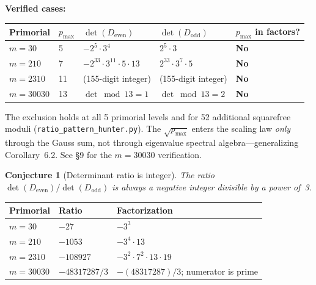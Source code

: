 \documentclass[11pt,letterpaper]{article}
\newtheorem{conjecture}[theorem]{Conjecture}
\theoremstyle{definition}
\begin{document}
\textbf{Verified cases:}

{\small
\begin{center}
\begin{tabular}{@{}llp{}p{}l@{}}
\toprule
Primorial & $p_{\text{max}}$ & $\det(D_{\text{even}})$ & $\det(D_{\text{odd}})$ & $p_{\text{max}}$ in factors? \\
\midrule
$m = 30$    & 5  & $-2^5 \cdot 3^4$                         & $2^5 \cdot 3$              & \textbf{No} \\
$m = 210$   & 7  & $-2^{33} \cdot 3^{11} \cdot 5 \cdot 13$  & $2^{33} \cdot 3^7 \cdot 5$ & \textbf{No} \\
$m = 2310$  & 11 & (155-digit integer)                       & (155-digit integer)        & \textbf{No} \\
$m = 30030$ & 13 & $\det \bmod 13 = 1$                       & $\det \bmod 13 = 2$        & \textbf{No} \\
\bottomrule
\end{tabular}
\end{center}
}

The exclusion holds at all 5 primorial levels and for 52 additional squarefree moduli (\texttt{ratio\_\allowbreak pattern\_\allowbreak hunter.py}).
The $\sqrt{p_{\text{max}}}$ enters the scaling law \emph{only} through the Gauss sum, not through eigenvalue spectral algebra---generalizing Corollary~6.2. See \S9 for the $m = 30030$ verification.

\begin{conjecture}[Determinant ratio is integer]
The ratio $\det(D_{\text{even}})/\det(D_{\text{odd}})$ is always a negative integer divisible by a power of~3.
\end{conjecture}

\begin{center}
\begin{tabular}{@{}lll@{}}
\toprule
Primorial & Ratio & Factorization \\
\midrule
$m = 30$    & $-27$          & $-3^3$                                \\
$m = 210$   & $-1053$        & $-3^4 \cdot 13$                       \\
$m = 2310$  & $-108927$      & $-3^2 \cdot 7^2 \cdot 13 \cdot 19$    \\
$m = 30030$ & $-48317287/3$  & $-(48317287)/3$; numerator is prime   \\
\bottomrule
\end{tabular}
\end{center}
\end{document}
